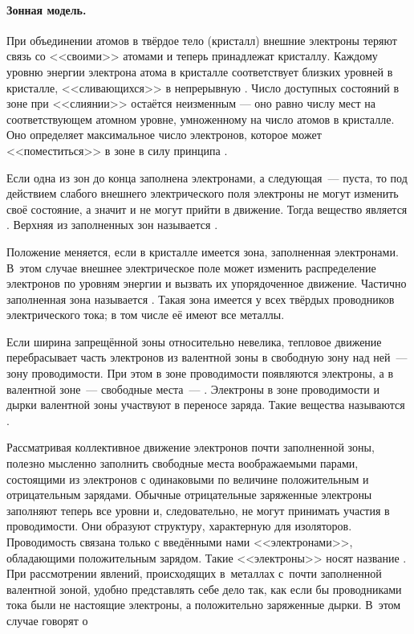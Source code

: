\paragraph{Зонная модель.}
При объединении атомов в твёрдое тело (кристалл) внешние электроны теряют связь
со <<своими>> атомами и теперь принадлежат  кристаллу.
Каждому уровню энергии электрона  атома в кристалле
соответствует  близких уровней в кристалле,
<<сливающихся>> в непрерывную .
Число доступных состояний в зоне при <<слиянии>> остаётся неизменным --- оно
равно числу мест на соответствующем атомном уровне,
умноженному на число атомов в кристалле. Оно определяет максимальное число
электронов, которое может <<поместиться>> в зоне в силу принципа
.

Если одна из зон до конца заполнена электронами, а следующая~---
пуста, то под действием слабого внешнего электрического поля
электроны не могут изменить своё состояние, а значит и не могут
прийти в движение. Тогда вещество является .
Верхняя из заполненных зон называется .

Положение меняется, если в кристалле имеется зона,  заполненная
электронами. В~этом случае внешнее электрическое поле может изменить
распределение электронов по уровням энергии и вызвать их упорядоченное движение.
Частично заполненная зона называется .
Такая зона имеется у всех твёрдых проводников электрического тока;
в том числе её имеют все металлы.

Если ширина запрещённой зоны относительно невелика, тепловое движение
перебрасывает часть электронов из валентной зоны в свободную зону над ней~---
зону проводимости. При этом в зоне проводимости появляются электроны,
а в валентной зоне~--- свободные места~--- .
Электроны в зоне проводимости и дырки валентной зоны участвуют в переносе заряда.
Такие вещества называются .

Рассматривая коллективное движение электронов почти заполненной зоны,
полезно мысленно заполнить свободные места
воображаемыми парами, состоящими из электронов с одинаковыми по величине
положительным и отрицательным зарядами. Обычные отрицательные заряженные
электроны заполняют теперь все уровни и, следовательно, не могут принимать
участия в проводимости. Они образуют структуру, характерную для изоляторов.
Проводимость связана только с введёнными нами
<<электронами>>, обладающими положительным зарядом. Такие <<электроны>> носят
название . При рассмотрении явлений, происходящих в~металлах
с~почти заполненной валентной зоной, удобно представлять себе дело так, как если
бы проводниками тока были не настоящие электроны, а положительно заряженные
дырки. В~этом случае говорят о 

